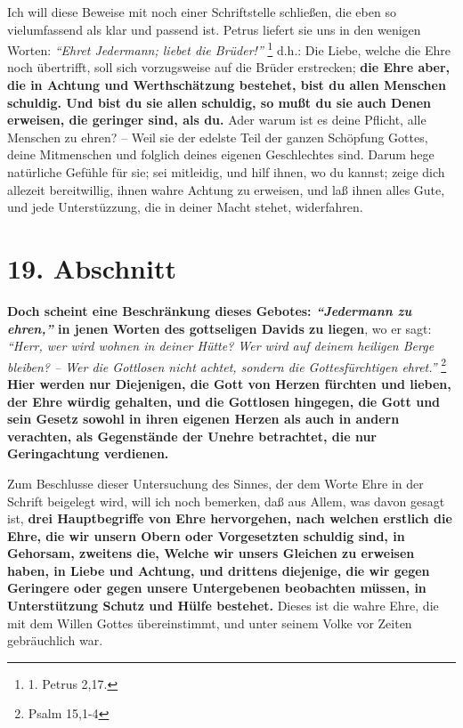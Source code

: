Ich will diese Beweise mit noch einer Schriftstelle schließen, die eben so
vielumfassend als klar und passend ist. Petrus liefert sie uns in den
wenigen Worten:
\textit{"`Ehret Jedermann; liebet die Brüder!"'}
\footnote{1. Petrus 2,17.}
d.h.: Die Liebe, welche die Ehre noch übertrifft, soll sich vorzugsweise auf die
Brüder erstrecken; \label{ref:09_18_ehre}
\textbf{die Ehre aber, die in Achtung und Werthschätzung bestehet,
bist du allen Menschen schuldig. Und bist du sie allen schuldig, so mußt du sie
auch Denen erweisen, die geringer sind, als du.} Ader warum
ist es deine Pflicht,
alle Menschen zu ehren? -- Weil sie der edelste Teil der ganzen Schöpfung
Gottes, deine Mitmenschen und folglich deines eigenen Geschlechtes sind. Darum
hege natürliche Gefühle für sie; sei mitleidig, und hilf ihnen, wo du kannst;
zeige dich allezeit bereitwillig, ihnen wahre Achtung zu erweisen, und laß ihnen
alles Gute, und jede Unterstüzzung, die in deiner Macht stehet, widerfahren.

\section{19. Abschnitt} \label{kap9_ab19}

 \label{ref:09_19_ehre}
\textbf{Doch scheint eine Beschränkung dieses Gebotes:
\textit{"`Jedermann zu ehren,"'} in jenen
Worten des gottseligen Davids zu liegen}, wo er sagt:
\textit{"`Herr, wer wird wohnen
in deiner Hütte? Wer wird auf deinem heiligen Berge bleiben? -- Wer die
Gottlosen nicht achtet, sondern die Gottesfürchtigen ehret."'}
\footnote{Psalm 15,1-4}
\textbf{Hier werden nur Diejenigen, die Gott von Herzen fürchten und lieben, der
Ehre würdig gehalten, und die Gottlosen hingegen,
die Gott und sein Gesetz
sowohl in ihren eigenen Herzen als auch in andern verachten, als Gegenstände der
Unehre betrachtet, die nur Geringachtung verdienen.}

\medskip

Zum Beschlusse dieser Untersuchung des Sinnes, der dem Worte Ehre in der Schrift
beigelegt wird, will ich noch bemerken, daß aus Allem, was davon gesagt ist,
\textbf{drei Hauptbegriffe von Ehre hervorgehen, nach welchen erstlich die Ehre,
die wir
unsern Obern oder Vorgesetzten schuldig sind, in Gehorsam, zweitens die, Welche
wir unsers Gleichen zu erweisen haben, in Liebe und Achtung, und drittens
diejenige, die wir gegen Geringere oder gegen unsere Untergebenen beobachten
müssen, in Unterstützung Schutz und Hülfe bestehet.} Dieses ist die wahre Ehre,
die mit dem Willen Gottes übereinstimmt, und unter seinem Volke vor Zeiten
gebräuchlich war.

